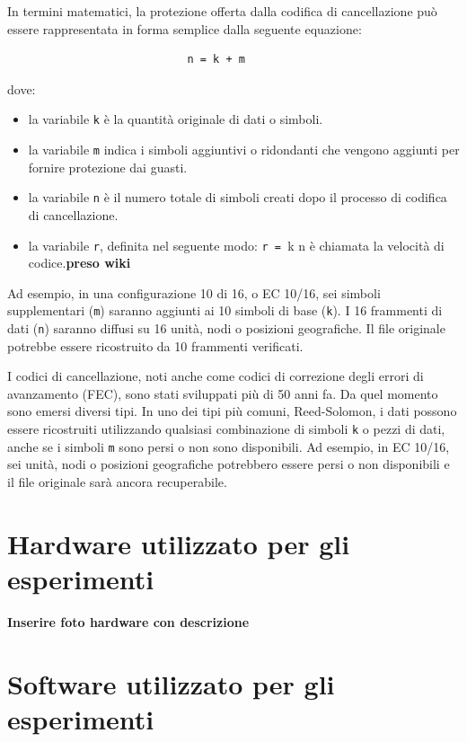 In termini matematici, la protezione offerta dalla codifica di cancellazione pu\`{o} essere rappresentata in forma semplice dalla seguente equazione:  
\begin{verbatim}
                       		n = k + m
\end{verbatim}
dove:
\begin{itemize}
\item 
la variabile \verb"k" \`{e} la quantit\`{a} originale di dati o simboli. 
\item
la variabile \verb"m" indica i simboli aggiuntivi o ridondanti che vengono aggiunti per fornire protezione dai guasti. 
\item
la variabile \verb"n" \`{e} il numero totale di simboli creati dopo il processo di codifica di cancellazione\cite{etichetta11}.
\item
la variabile \verb"r", definita nel seguente modo: 
                       		\verb"r = "{k \over n}
\`{e} chiamata la velocit\`{a} di codice.\textbf{preso wiki}
\end{itemize}

Ad esempio, in una configurazione 10 di 16, o EC 10/16, sei simboli supplementari (\verb"m") saranno aggiunti ai 10 simboli di base (\verb"k"). I 16 frammenti di dati (\verb"n") saranno diffusi su 16 unit\`{a}, nodi o posizioni geografiche. Il file originale potrebbe essere ricostruito da 10 frammenti verificati.\cite{etichetta11}

I codici di cancellazione, noti anche come codici di correzione degli errori di avanzamento (FEC), sono stati sviluppati pi\`{u} di 50 anni fa. Da quel momento sono emersi diversi tipi. In uno dei tipi pi\`{u} comuni, Reed-Solomon, i dati possono essere ricostruiti utilizzando qualsiasi combinazione di simboli \verb"k" o pezzi di dati, anche se i simboli \verb"m" sono persi o non sono disponibili. Ad esempio, in EC 10/16, sei unit\`{a}, nodi o posizioni geografiche potrebbero essere persi o non disponibili e il file originale sar\`{a} ancora recuperabile.\cite{etichetta11}
 
\item
\section{Hardware utilizzato per gli esperimenti}
\textbf{Inserire foto hardware con descrizione}
\item
\section{Software utilizzato per gli esperimenti}
\item
